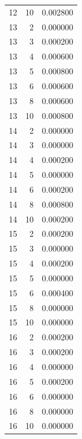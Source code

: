 \begin{tabular}{rrr}
12 & 10 & 0.002800 \\
13 & 2 & 0.000000 \\
13 & 3 & 0.000200 \\
13 & 4 & 0.000600 \\
13 & 5 & 0.000800 \\
13 & 6 & 0.000600 \\
13 & 8 & 0.000600 \\
13 & 10 & 0.000800 \\
14 & 2 & 0.000000 \\
14 & 3 & 0.000000 \\
14 & 4 & 0.000200 \\
14 & 5 & 0.000000 \\
14 & 6 & 0.000200 \\
14 & 8 & 0.000800 \\
14 & 10 & 0.000200 \\
15 & 2 & 0.000200 \\
15 & 3 & 0.000000 \\
15 & 4 & 0.000200 \\
15 & 5 & 0.000000 \\
15 & 6 & 0.000400 \\
15 & 8 & 0.000000 \\
15 & 10 & 0.000000 \\
16 & 2 & 0.000200 \\
16 & 3 & 0.000200 \\
16 & 4 & 0.000000 \\
16 & 5 & 0.000200 \\
16 & 6 & 0.000000 \\
16 & 8 & 0.000000 \\
16 & 10 & 0.000000 \\
\bottomrule
\end{tabular}
